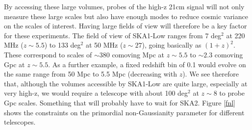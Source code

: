 \documentclass{PoS}
\begin{document}
By accessing these large volumes, probes of the high-z 21cm signal will not only measure these large scales but also have enough modes to reduce cosmic variance on the scales of interest.
Having large fields of view will therefore be a key factor for these experiments. The field of view of SKA1-Low ranges from 7 deg$^2$ at 220 MHz ($z\sim 5.5$) to 133 deg$^2$ at 50 MHz ($z\sim 27$), going basically as $(1+z)^2$. These correspond to scales of $\sim 380$ comoving Mpc at $z\sim 5.5$ to $\sim 2.3$ comoving Gpc at $z\sim 5.5$. As a further example, a fixed redshift bin of 0.1 would evolve on the same range from 50 Mpc to 5.5 Mpc (decreasing with $z$). We see therefore that, although the volumes accessible by SKA1-Low are quite large, especially at very high-z, we would require a telescope with about 100 deg$^2$ at $z\sim 8$ to probe Gpc scales. Something that will probably have to wait for SKA2. Figure \ref{fnl} shows the constraints on the primordial non-Gaussianity parameter for different telescopes.
\end{document}
